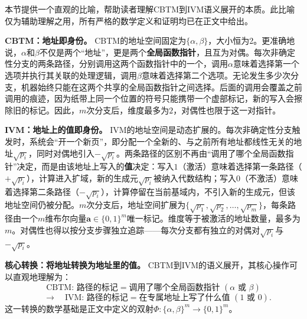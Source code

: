\documentclass{ctexart}
\begin{document}
	本节提供一个直观的比喻，帮助读者理解CBTM到IVM语义展开的本质。此比喻仅为辅助理解之用，所有严格的数学定义和证明均已在正文中给出。
	
	\textbf{CBTM：地址即身份。} CBTM的地址空间固定为$\{\alpha, \beta\}$，大小恒为2。更准确地说，$\alpha$和$\beta$不仅是两个``地址''，更是两个\textbf{全局函数指针}，且互为对偶。每次非确定性分支的两条路径，分别调用这两个函数指针中的一个，调用$\alpha$意味着选择第一个选项并执行其关联的处理逻辑，调用$\beta$意味着选择第二个选项。无论发生多少次分支，机器始终只能在这两个共享的全局函数指针之间选择。后面的调用会覆盖之前调用的痕迹，因为纸带上同一个位置的符号只能携带一个虚部标记，新的写入会擦除旧的标记。因此，$m$次分支后，维度最多为$2$，对偶性也限于这一对指针。
	
	\textbf{IVM：地址上的值即身份。} IVM的地址空间是动态扩展的。每次非确定性分支触发时，系统会``开一个新页''，即分配一个全新的、与之前所有地址都线性无关的地址$\sqrt{p_i}$，同时对偶地引入$-\sqrt{p_i}$。两条路径的区别不再由``调用了哪个全局函数指针''决定，而是由该地址上写入的\textbf{值}决定：写入$1$（激活）意味着选择第一条路径（$+\sqrt{p_i}$），计算进入扩域，新的生成元$\sqrt{p_i}$被纳入代数结构；写入$0$（不激活）意味着选择第二条路径（$-\sqrt{p_i}$），计算停留在当前基域内，不引入新的生成元，但该地址空间仍被分配。$m$次分支后，地址空间扩展为$\{\sqrt{p_1}, \sqrt{p_2}, \dots, \sqrt{p_m}\}$，每条路径由一个$m$维布尔向量$\mathbf{a} \in \{0,1\}^m$唯一标记。维度等于被激活的地址数量，最多为$m$。对偶性也得以按分支步骤独立追踪——每次分支都有独立的对偶对$\sqrt{p_i}$与$-\sqrt{p_i}$。
	
	\textbf{核心转换：将地址转换为地址里的值。} CBTM到IVM的语义展开，其核心操作可以直观地理解为：
	\[
	\text{CBTM: 路径的标记} = \text{调用了哪个全局函数指针 } (\alpha \text{ 或 } \beta)
	\]
	\[
	\quad  \longrightarrow \quad \text{IVM: 路径的标记} = \text{在专属地址上写了什么值 } (1 \text{ 或 } 0).
	\]
	这一转换的数学基础是正文中定义的双射$\Phi: \{\alpha, \beta\}^m \to \{0,1\}^m$。
	
\end{document}
